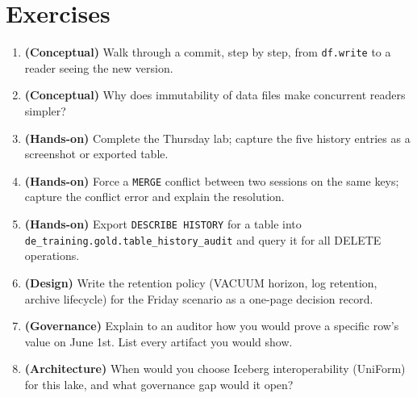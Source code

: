 \section{Exercises}
\begin{enumerate}
    \item \textbf{(Conceptual)} Walk through a commit, step by step, from \texttt{df.write} to a reader seeing the new version.
    \item \textbf{(Conceptual)} Why does immutability of data files make concurrent readers simpler?
    \item \textbf{(Hands-on)} Complete the Thursday lab; capture the five history entries as a screenshot or exported table.
    \item \textbf{(Hands-on)} Force a \texttt{MERGE} conflict between two sessions on the same keys; capture the conflict error and explain the resolution.
    \item \textbf{(Hands-on)} Export \texttt{DESCRIBE HISTORY} for a table into \texttt{de\_training.gold.table\_history\_audit} and query it for all DELETE operations.
    \item \textbf{(Design)} Write the retention policy (VACUUM horizon, log retention, archive lifecycle) for the Friday scenario as a one-page decision record.
    \item \textbf{(Governance)} Explain to an auditor how you would prove a specific row's value on June 1st. List every artifact you would show.
    \item \textbf{(Architecture)} When would you choose Iceberg interoperability (UniForm) for this lake, and what governance gap would it open?
\end{enumerate}
